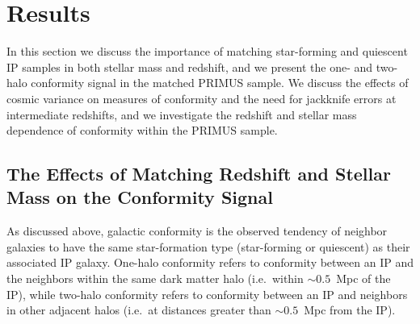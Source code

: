 
\section{Results}\label{sec:results}

In this section we discuss the importance of matching star-forming and quiescent IP 
samples in both stellar mass and redshift, and we present the one- and two-halo 
conformity signal in the matched PRIMUS sample.  We discuss the effects of 
cosmic variance on measures of conformity and the need for jackknife
errors at intermediate redshifts, and we investigate the redshift and stellar mass 
dependence of conformity within the PRIMUS sample.

\subsection{The Effects of Matching Redshift and Stellar Mass on the Conformity Signal}\label{sec:LTfraction}

As discussed above, galactic conformity is the observed tendency of neighbor 
galaxies to have the same star-formation type (star-forming or quiescent) 
as their associated IP galaxy.
One-halo conformity refers to conformity between an IP and the neighbors within the 
same dark matter halo (i.e.~within $\sim0.5$~Mpc of the IP),
while two-halo conformity refers to conformity between an IP and neighbors in other 
adjacent halos (i.e.~at distances greater than $\sim0.5$~Mpc from the IP).


